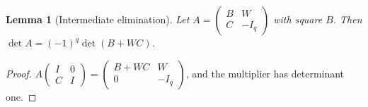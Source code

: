 \documentclass[11pt,a4paper]{article}
\theoremstyle{plain}
\newtheorem{lemma}[theorem]{Lemma}
\theoremstyle{definition}
\theoremstyle{remark}
\newcommand{\C}{\mathbb C}
\begin{document}
\begin{lemma}[Intermediate elimination]\label{lem:elimination}
Let $A=\begin{pmatrix}B&W\\C&-I_q\end{pmatrix}$ with square $B$. Then $\det A=(-1)^q\det(B+WC)$.
\end{lemma}
\begin{proof}
$A\begin{pmatrix}I&0\\C&I\end{pmatrix}=\begin{pmatrix}B+WC&W\\0&-I_q\end{pmatrix}$, and the multiplier has determinant one.
\end{proof}
\end{document}
